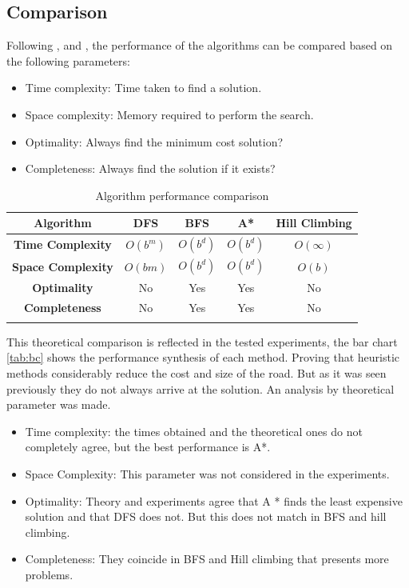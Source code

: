 \documentclass[11pt]{article}
\begin{document}
\subsection{Comparison}
Following \cite{Maharshi2018ComparativeAO}, \cite{HLweb} and \cite{stuart2003artificial}, the performance of the algorithms can be compared based on the following parameters:
\begin{itemize}
    \item Time complexity: Time taken to find a solution.
    \item Space complexity: Memory required to perform the search.
    \item Optimality: Always find the minimum cost solution?
    \item Completeness: Always find the solution if it exists?
\end{itemize}
\begin{longtable}[c]{|c|c|c|c|c|}
\hline
\textbf{Algorithm}        & \textbf{DFS} & \textbf{BFS} & \textbf{A*} & \textbf{Hill Climbing} \\ \hline
\endhead
%
\textbf{Time Complexity}  & $O(b^{m})$   & $O(b^{d})$   & $O(b^{d})$  & $O(\infty)$            \\ \hline
\textbf{Space Complexity} & $O(bm)$      & $O(b^{d})$   & $O(b^{d})$  & $O(b)$             \\ \hline
\textbf{Optimality}       & No           & Yes          & Yes         & No                     \\ \hline
\textbf{Completeness}     & No           & Yes          & Yes         & No                     \\ \hline
\caption{Algorithm performance comparison}
\label{tab:my-table}
\end{longtable}
This theoretical comparison is reflected in the tested experiments, the bar chart \ref{tab:bc} shows the performance synthesis of each method. Proving that heuristic methods considerably reduce the cost and size of the road. But as it was seen previously they do not always arrive at the solution. An analysis by theoretical parameter was made.
\begin{itemize}
    \item Time complexity: the times obtained and the theoretical ones do not completely agree, but the best performance is A*.
    \item Space Complexity: This parameter was not considered in the experiments.
    \item Optimality: Theory and experiments agree that A * finds the least expensive solution and that DFS does not. But this does not match in BFS and hill climbing.
    \item Completeness: They coincide in BFS and Hill climbing that presents more problems.
\end{itemize}
\end{document}
